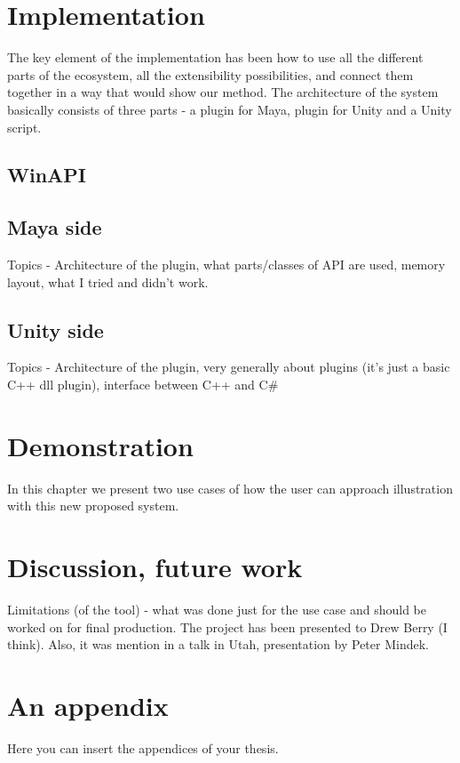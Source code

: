 \documentclass[
  digital, %
  table,   %
  lof,     %
  lot,     %
]{fithesis3}
\begin{document}
\chapter{Implementation}
The key element of the implementation has been how to use all the different parts of the ecosystem, all the extensibility possibilities, and connect them together in a way that would show our method. The architecture of the system basically consists of three parts - a plugin for Maya, plugin for Unity and a Unity script.
\section{WinAPI}
\section{Maya side}
Topics - Architecture of the plugin, what parts/classes of API are used, memory layout, what I tried and didn't work.
\section{Unity side}
Topics - Architecture of the plugin, very generally about plugins (it's just a basic C++ dll plugin), interface between C++ and C\#

\chapter{Demonstration}
In this chapter we present two use cases of how the user can approach illustration with this new proposed system.

\chapter{Discussion, future work}
Limitations (of the tool) - what was done just for the use case and should be worked on for final production.
The project has been presented to Drew Berry (I think). Also, it was mention in a talk in Utah, presentation by Peter Mindek.

\appendix %
\chapter{An appendix}
Here you can insert the appendices of your thesis.
\end{document}

